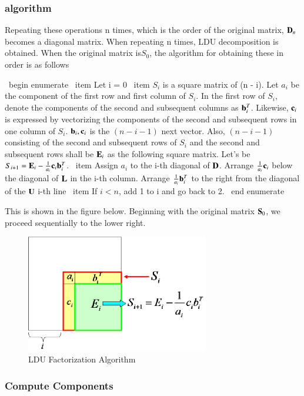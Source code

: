 \subsubsection{algorithm}

Repeating these operations n times, which is the order of the original matrix, $\mathbf{D}_n$ becomes a diagonal matrix. When repeating n times, LDU decomposition is obtained.
When the original matrix is ​​$S_0$, the algorithm for obtaining these in order is as follows

\ begin {enumerate}
\ item Let i = 0
\ item $S_i$ is a square matrix of (n - i). Let $a_i$ be the component of the first row and first column of $S_i$. In the first row of $S_i$, denote the components of the second and subsequent columns as $\mathbf{b}^T_i$. Likewise, $\mathbf{c}_i$ is expressed by vectorizing the components of the second and subsequent rows in one column of $S_i$. $\mathbf{b}_i,\mathbf{c}_i$ is the $(n-i-1)$ next vector. Also, $(n-i-1)$ consisting of the second and subsequent rows of $S_i$ and the second and subsequent rows shall be $\mathbf{E}_i$ as the following square matrix. Let's be $S_{i+1} = \mathbf{E}_i - \frac{1}{a_i}\mathbf{c}_i\mathbf{b}^T_i$.
\ item Assign $a_i$ to the i-th diagonal of $\mathbf{D}$. Arrange $\frac{1}{a_i}\mathbf{c}_i$ below the diagonal of $\mathbf{L}$ in the i-th column. Arrange $\frac{1}{a_i}\mathbf{b}^T_i$ to the right from the diagonal of the $\mathbf{U}$ i-th line
\ item If $i<n$, add 1 to i and go back to 2.
\ end {enumerate}

This is shown in the figure below. Beginning with the original matrix $\mathbf{S}_0$, we proceed sequentially to the lower right.

\begin{figure}
\begin{center}
\includegraphics[width=80mm]{images/ldu_frac_algorithm.eps}
\caption{LDU Factorization Algorithm}
\end{center}
\end{figure}

\subsubsection{Compute Components}

